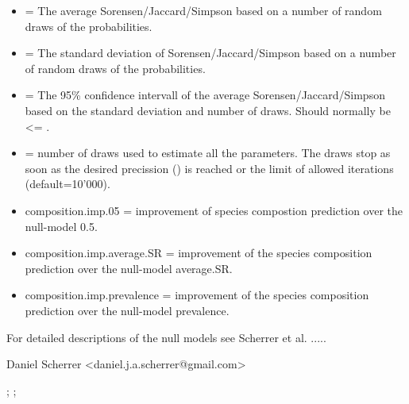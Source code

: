\documentclass[a4paper]{book}
\begin{document}
\begin{Note}
\begin{itemize}
\item {} = The average Sorensen/Jaccard/Simpson based on a number of random draws of the probabilities.
\item {} = The standard deviation of Sorensen/Jaccard/Simpson based on a number of random draws of the probabilities.
\item {} = The 95\% confidence intervall of the average Sorensen/Jaccard/Simpson based on the standard deviation and number of draws. Should normally be <= .
\item {} = number of draws used to estimate all the parameters. The draws stop as soon as the desired precission () is reached or the limit of allowed iterations (default=10'000).
\item composition.imp.05 = improvement of species compostion prediction over the null-model 0.5.
\item composition.imp.average.SR = improvement of the species composition prediction over the null-model average.SR.
\item composition.imp.prevalence = improvement of the species composition prediction over the null-model prevalence.

\end{itemize}


For detailed descriptions of the null models see Scherrer et al. .....
\end{Note}
%
\begin{Author}\relax
Daniel Scherrer <daniel.j.a.scherrer@gmail.com>
\end{Author}
%
\begin{SeeAlso}\relax
{}; ;
\end{SeeAlso}
%
\end{document}
